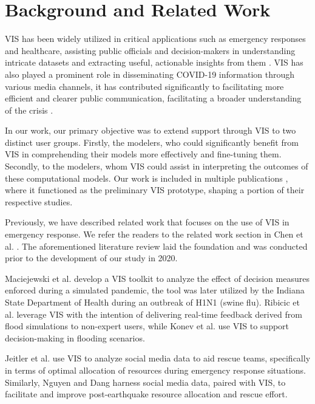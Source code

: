 \section{Background and Related Work}

\ac{VIS} has been widely utilized in critical applications such as emergency responses and healthcare, assisting public officials and decision-makers in understanding intricate datasets and extracting useful, actionable insights from them \cite{dusse2016Information}. 
\ac{VIS} has also played a prominent role in disseminating COVID-19 information through various media channels, it has contributed significantly to facilitating more efficient and clearer public communication, facilitating a broader understanding of the crisis \cite{johnshopkinsuniversityCOVID19}.

In our work, our primary objective was to extend support through \ac{VIS} to two distinct user groups.
Firstly, the modelers, who could significantly benefit from VIS in comprehending their models more effectively and fine-tuning them.
Secondly, to the modelers, whom VIS could assist in interpreting the outcomes of these computational models. Our work is included in multiple publications \cite{chen2022RAMPVIS,dykes2022Visualizationb,khan2022Propagating,khan2022Rapid,rydow2023RAMPVIS}, where it functioned as the preliminary VIS prototype, shaping a portion of their respective studies.


Previously, we have described related work that focuses on the use of \ac{VIS} in emergency response. We refer the readers to the related work section in Chen et al. \cite{chen2022RAMPVIS}. The aforementioned literature review laid the foundation and was conducted prior to the development of our study in 2020.

Maciejewski et al. \cite{maciejewski2011Pandemica} develop a VIS toolkit to analyze the effect of decision measures enforced during a simulated pandemic, the tool was later utilized by the Indiana State Department of Health during an outbreak of H1N1 (swine flu).
Ribicic et al. \cite{ribicic2012Sketching} leverage VIS with the intention of delivering real-time feedback derived from flood simulations to non-expert users, while Konev et al. \cite{konev2014Run} use VIS to support decision-making in flooding scenarios.

Jeitler et al. \cite{jeitler2019RescueMark} use VIS to analyze social media data to aid rescue teams, specifically in terms of optimal allocation of resources during emergency response situations.
Similarly, Nguyen and Dang \cite{nguyen2019EQSA} harness social media data, paired with VIS, to facilitate and improve post-earthquake resource allocation and rescue effort.

